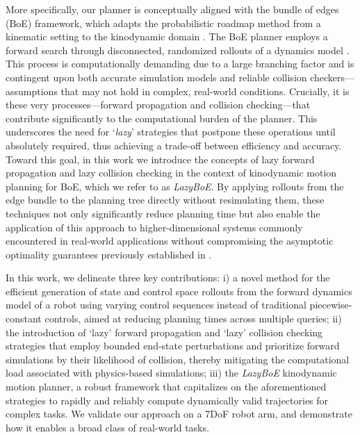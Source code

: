 

More specifically, our planner is conceptually aligned with the bundle of edges (BoE) framework, which adapts the probabilistic roadmap method from a kinematic setting to the kinodynamic domain \cite{kavraki1996probabilistic}. 
The BoE planner %
employs a forward search through disconnected, randomized rollouts of a dynamics model \cite{shome2021asymptotically}. This process is computationally demanding due to a large branching factor and is contingent upon both accurate simulation models and reliable collision checkers---assumptions that may not hold in complex, real-world conditions.
Crucially, it is these very processes---forward propagation and collision checking---that contribute significantly to the computational burden of the planner. This underscores the need for `\textsl{lazy}' strategies that postpone these operations until absolutely required, thus achieving a trade-off between efficiency and accuracy.  
Toward this goal, in this work we introduce the concepts of lazy forward propagation and lazy collision checking in the context of kinodynamic motion planning for BoE, which we refer to as \textsl{LazyBoE}. 
By applying rollouts from the edge bundle to the planning tree directly without resimulating them, these techniques not only significantly reduce planning time but also enable the application of this approach to higher-dimensional systems commonly encountered in real-world applications without compromising the asymptotic optimality guarantees previously established in \cite{shome2021asymptotically}.

In this work, we delineate three key contributions: i) a novel method for the efficient generation of state and control space rollouts from the forward dynamics model of a robot using varying control sequences instead of traditional piecewise-constant controls, aimed at reducing planning times across multiple queries; ii) the introduction of `lazy' forward propagation and `lazy' collision checking strategies that employ bounded end-state perturbations and prioritize forward simulations by their likelihood of collision, thereby mitigating the computational load associated with physics-based simulations; iii) the \textsl{LazyBoE} kinodynamic motion planner, a robust framework that capitalizes on the aforementioned strategies to rapidly and reliably compute dynamically valid trajectories for complex tasks. We validate our approach on a 7DoF robot arm, and demonstrate how it enables a broad class of real-world tasks.
